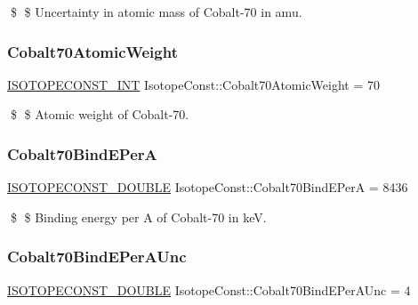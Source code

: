 \$ \$ Uncertainty in atomic mass of Cobalt-\/70 in amu. \mbox{\label{group___isotope_const-_cobalt-_co70_gaad8ec5094c0ec53e6e9759d05a4a57ba}} 
\subsubsection{\texorpdfstring{Cobalt70\+Atomic\+Weight}{Cobalt70AtomicWeight}}
{\footnotesize\ttfamily \mbox{\hyperlink{group___isotope_const-_macros_ga5f18360b3e99483a35c32d789e62621c}{I\+S\+O\+T\+O\+P\+E\+C\+O\+N\+S\+T\+\_\+\+I\+NT}} Isotope\+Const\+::\+Cobalt70\+Atomic\+Weight = 70}

\$ \$ Atomic weight of Cobalt-\/70. \mbox{\label{group___isotope_const-_cobalt-_co70_ga8e2f206b80698b69fd7fb3896cbc7f1c}} 
\subsubsection{\texorpdfstring{Cobalt70\+Bind\+E\+PerA}{Cobalt70BindEPerA}}
{\footnotesize\ttfamily \mbox{\hyperlink{group___isotope_const-_macros_ga8f45a7272ce02c0b4c65c44636ed719a}{I\+S\+O\+T\+O\+P\+E\+C\+O\+N\+S\+T\+\_\+\+D\+O\+U\+B\+LE}} Isotope\+Const\+::\+Cobalt70\+Bind\+E\+PerA = 8436}

\$ \$ Binding energy per A of Cobalt-\/70 in keV. \mbox{\label{group___isotope_const-_cobalt-_co70_ga4a1b7e0e51e0f832f83005e934ca461b}} 
\subsubsection{\texorpdfstring{Cobalt70\+Bind\+E\+Per\+A\+Unc}{Cobalt70BindEPerAUnc}}
{\footnotesize\ttfamily \mbox{\hyperlink{group___isotope_const-_macros_ga8f45a7272ce02c0b4c65c44636ed719a}{I\+S\+O\+T\+O\+P\+E\+C\+O\+N\+S\+T\+\_\+\+D\+O\+U\+B\+LE}} Isotope\+Const\+::\+Cobalt70\+Bind\+E\+Per\+A\+Unc = 4}

